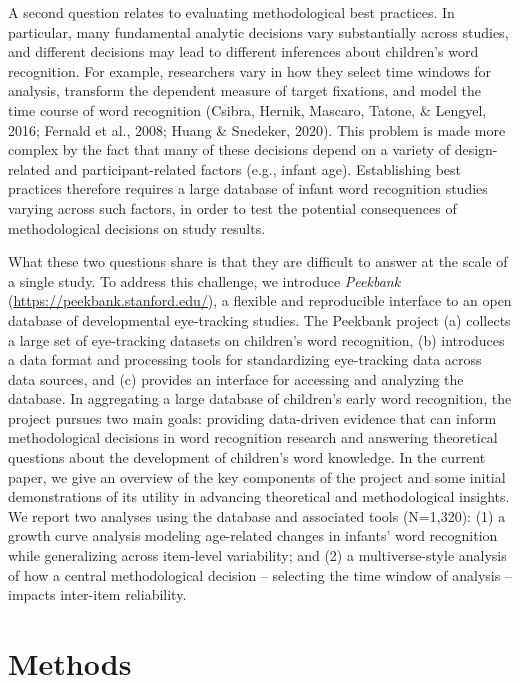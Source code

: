 \documentclass[10pt, letterpaper]{article}
\begin{document}
A second question relates to evaluating methodological best practices.
In particular, many fundamental analytic decisions vary substantially
across studies, and different decisions may lead to different inferences
about children's word recognition. For example, researchers vary in how
they select time windows for analysis, transform the dependent measure
of target fixations, and model the time course of word recognition
(Csibra, Hernik, Mascaro, Tatone, \& Lengyel, 2016; Fernald et al.,
2008; Huang \& Snedeker, 2020). This problem is made more complex by the
fact that many of these decisions depend on a variety of design-related
and participant-related factors (e.g., infant age). Establishing best
practices therefore requires a large database of infant word recognition
studies varying across such factors, in order to test the potential
consequences of methodological decisions on study results.

What these two questions share is that they are difficult to answer at
the scale of a single study. To address this challenge, we introduce
\emph{Peekbank} (\url{https://peekbank.stanford.edu/}), a flexible and
reproducible interface to an open database of developmental eye-tracking
studies. The Peekbank project (a) collects a large set of eye-tracking
datasets on children's word recognition, (b) introduces a data format
and processing tools for standardizing eye-tracking data across data
sources, and (c) provides an interface for accessing and analyzing the
database. In aggregating a large database of children's early word
recognition, the project pursues two main goals: providing data-driven
evidence that can inform methodological decisions in word recognition
research and answering theoretical questions about the development of
children's word knowledge. In the current paper, we give an overview of
the key components of the project and some initial demonstrations of its
utility in advancing theoretical and methodological insights. We report
two analyses using the database and associated tools (N=1,320): (1) a
growth curve analysis modeling age-related changes in infants' word
recognition while generalizing across item-level variability; and (2) a
multiverse-style analysis of how a central methodological decision --
selecting the time window of analysis -- impacts inter-item reliability.

\hypertarget{methods}{%
\section{Methods}\label{methods}}
\end{document}
